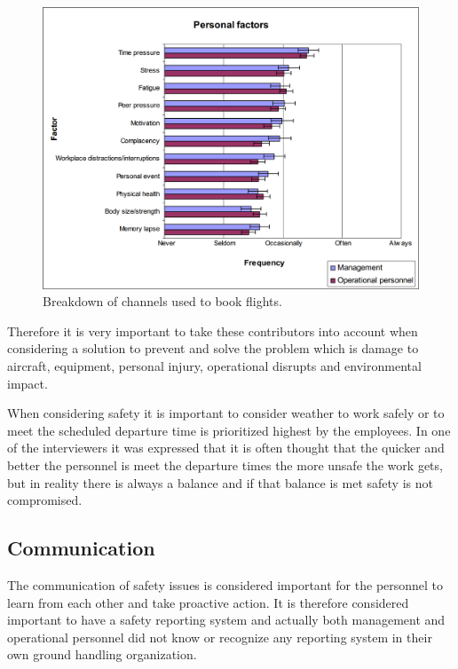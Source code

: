 \begin{figure}[H]
\centering
\includegraphics[width=\textwidth]{Grafik/PersonalFactors}
\caption{Breakdown of channels used to book flights.}
\label{PersonalFactors}
\end{figure}

Therefore it is very important to take these contributors into account when considering a solution to prevent and solve the problem which is damage to aircraft, equipment, personal injury, operational disrupts and environmental impact.

When considering safety it is important to consider weather to work safely or to meet the scheduled departure time is prioritized highest by the employees. In one of the interviewers it was expressed that it is often thought that the quicker and better the personnel is meet the departure times the more unsafe the work gets, but in reality there is always a balance and if that balance is met safety is not compromised.

\subsection{Communication}
The communication of safety issues is considered important for the personnel to learn from each other and take proactive action. It is therefore considered important to have a safety reporting system and actually both management and operational personnel did not know or recognize any reporting system in their own ground handling organization.

